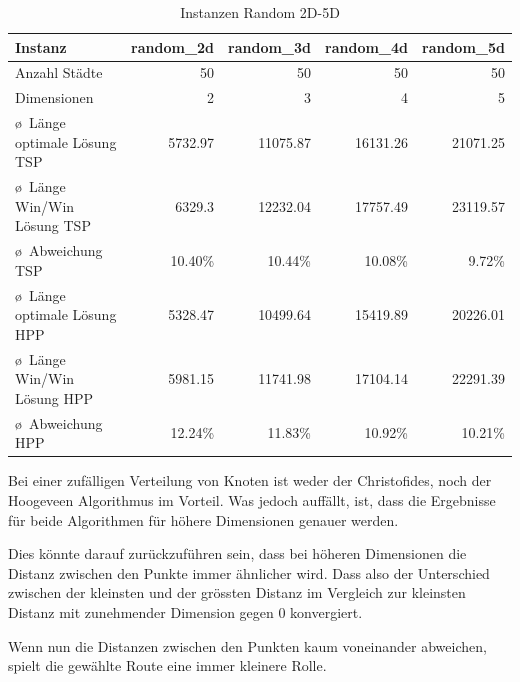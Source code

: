 \documentclass[11pt,a4paper]{article}
\begin{document}
\begin{table}[H]
        \centering
        \begin{tabular}{| l | r | r | r | r |}
            \hline
            Instanz                     & \textbf{random\_2d}
                                        & \textbf{random\_3d}
                                        & \textbf{random\_4d}
                                        & \textbf{random\_5d} \\ \hline
            Anzahl Städte               & 50        & 50        & 50        & 50            \\ \hline
            Dimensionen                 & 2         & 3         & 4         & 5       \\ \hline
            \o\ Länge optimale Lösung TSP   & 5732.97   & 11075.87  & 16131.26  & 21071.25  \\ \hline
            \o\ Länge Win/Win Lösung  TSP   & 6329.3    & 12232.04  & 17757.49  & 23119.57  \\ \hline
            \o\ Abweichung TSP              & 10.40\%   & 10.44\%   & 10.08\%   & 9.72\%    \\ \hline
            \o\ Länge optimale Lösung HPP   & 5328.47   & 10499.64  & 15419.89  & 20226.01  \\ \hline
            \o\ Länge Win/Win Lösung  HPP   & 5981.15   & 11741.98  & 17104.14  & 22291.39  \\ \hline
            \o\ Abweichung HPP              & 12.24\%   & 11.83\%   & 10.92\%   & 10.21\%   \\ \hline
        \end{tabular}
        \caption{Instanzen Random 2D-5D}
        \label{tab:instanzen_random}
\end{table}

Bei einer zufälligen Verteilung von Knoten ist weder der Christofides, noch der Hoogeveen Algorithmus im Vorteil. Was jedoch auffällt, ist, dass die Ergebnisse für beide Algorithmen für höhere Dimensionen genauer werden.

Dies könnte darauf zurückzuführen sein, dass bei höheren Dimensionen die Distanz zwischen den Punkte immer ähnlicher wird. Dass also der Unterschied zwischen der kleinsten und der grössten Distanz im Vergleich zur kleinsten Distanz mit zunehmender Dimension gegen 0 konvergiert.\cite{beyer99}

Wenn nun die Distanzen zwischen den Punkten kaum voneinander abweichen, spielt die gewählte Route eine immer kleinere Rolle.
\end{document}
